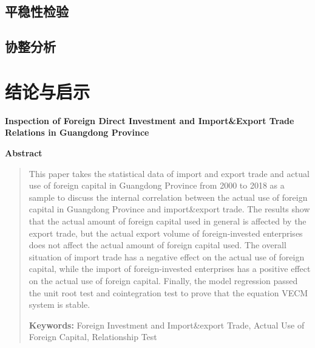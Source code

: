 \documentclass{article}
\begin{document}
{{\ }

{\ }


\noindent  \subsection{平稳性检验}
\vspace{0.1cm}



\noindent  \subsection{协整分析}
\vspace{0.1cm}


\noindent  \section{结论与启示}
\vspace{0.1cm}





\newpage%
\large
\begin{center}
	\textbf{Inspection of Foreign Direct Investment and Import\&Export Trade Relations in Guangdong Province}
		
\textbf{Abstract}

\end{center}

\begin{abstract}
	This paper takes the statistical data of import and export trade and actual use of foreign capital in Guangdong Province from 2000 to 2018 as a sample to discuss the internal correlation between the actual use of foreign capital in Guangdong Province and import\&export trade. The results show that the actual amount of foreign capital used in general is affected by the export trade, but the actual export volume of foreign-invested enterprises does not affect the actual amount of foreign capital used. The overall situation of import trade has a negative effect on the actual use of foreign capital, while the import of foreign-invested enterprises has a positive effect on the actual use of foreign capital. Finally, the model regression passed the unit root test and cointegration test to prove that the equation VECM system is stable.

\par \textbf{Keywords:} Foreign Investment and Import\&export Trade,   Actual Use of Foreign Capital,  Relationship Test
\end{abstract}




}
\end{document}
